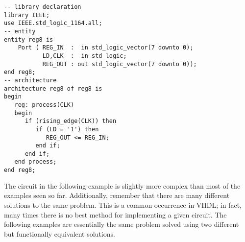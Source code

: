 \noindent
\begin{minipage}{0.99\linewidth}
\begin{lstlisting}[label=ex23_code, caption=Solution to Example 23.]
-- library declaration
library IEEE;
use IEEE.std_logic_1164.all;
-- entity
entity reg8 is
    Port ( REG_IN  :  in std_logic_vector(7 downto 0);
           LD,CLK  :  in std_logic;
           REG_OUT : out std_logic_vector(7 downto 0));
end reg8;
-- architecture
architecture reg8 of reg8 is
begin
   reg: process(CLK)
   begin
      if (rising_edge(CLK)) then 
         if (LD = '1') then 
            REG_OUT <= REG_IN; 
         end if;
      end if;
   end process; 
end reg8;
\end{lstlisting}
\end{minipage}

The circuit in the following example is slightly more complex than most of the examples seen so far. Additionally, remember that there are many different solutions to the same problem. This is a common occurrence in VHDL; in fact, many times there is no best method for implementing a given circuit. The following examples are essentially the same problem solved using two different but functionally equivalent solutions.


